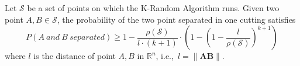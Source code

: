 \begin{thm}
    Let $\mathcal{S}$ be a set of points on which the K-Random Algorithm runs. Given two point $A, B \in \mathcal{S}$, the probability of the two point separated in one cutting satisfies
    \begin{equation}
    \nonumber
        P(A\ and\ B\ separated) \ge 1 - \frac{\rho(\mathcal{S})}{l \cdot (k+1)} \cdot (1 - (1 - \frac{l}{\rho(\mathcal{S})})^{k+1})
    \end{equation}
    where $l$ is the distance of point $A, B$ in $\mathbb{R}^n$, i.e.,\ $l = \|\mathbf{AB}\|$.
\end{thm}